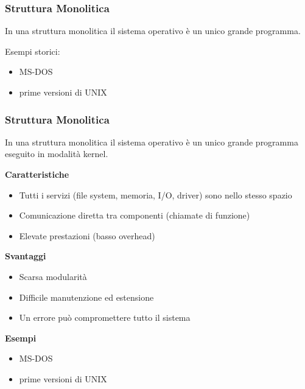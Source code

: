 \documentclass{beamer}
\begin{document}

\begin{frame}
	\frametitle{Struttura Monolitica}
	
	In una struttura monolitica
	il sistema operativo è un unico grande programma.
	
	Esempi storici:
	
	\begin{itemize}
		\item MS-DOS
		\item prime versioni di UNIX
	\end{itemize}
	
\end{frame}


\begin{frame}
	\frametitle{Struttura Monolitica}
	
	In una struttura monolitica il sistema operativo è
	un unico grande programma eseguito in modalità kernel.
	
	\vspace{0.3cm}
	
	\textbf{Caratteristiche}
	\begin{itemize}
		\item Tutti i servizi (file system, memoria, I/O, driver) sono nello stesso spazio
		\item Comunicazione diretta tra componenti (chiamate di funzione)
		\item Elevate prestazioni (basso overhead)
	\end{itemize}
	
	\vspace{0.3cm}
	
	\textbf{Svantaggi}
	\begin{itemize}
		\item Scarsa modularità
		\item Difficile manutenzione ed estensione
		\item Un errore può compromettere tutto il sistema
	\end{itemize}
	
	\vspace{0.3cm}
	
	\textbf{Esempi}
	\begin{itemize}
		\item MS-DOS
		\item prime versioni di UNIX
	\end{itemize}
	
\end{frame}
\end{document}
